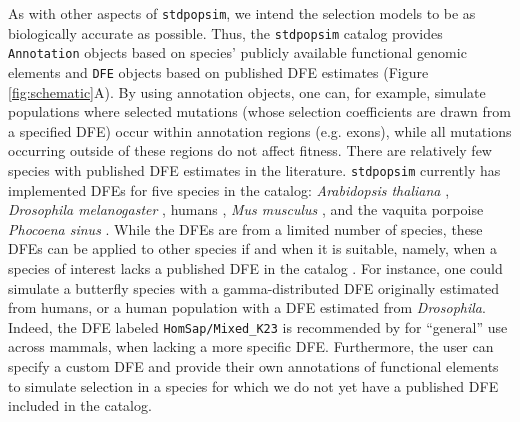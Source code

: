 \documentclass[hidelinks]{article}
\newcommand{\stdpopsim}{\texttt{stdpopsim}\xspace}
\begin{document}
    As with other aspects of \stdpopsim, we intend the selection models to be as biologically accurate as possible.
    Thus, the \stdpopsim catalog provides \texttt{Annotation} objects based on species' publicly available functional genomic elements
    and \texttt{DFE} objects based on published DFE estimates (Figure \ref{fig:schematic}A).
    By using annotation objects, one can, for example, simulate populations where selected mutations (whose selection
    coefficients are drawn from a specified DFE) occur within annotation regions (e.g. exons), while all mutations
    occurring outside of these regions do not affect fitness.
    There are relatively few species with published DFE estimates in the literature.
    \stdpopsim currently has implemented DFEs for five species in the catalog:
    \textit{Arabidopsis thaliana} \citep{huber2018gene},
    \textit{Drosophila melanogaster} \citep{ragsdale2016triallelic,huber2017determining,zhen2021greater},
    humans \citep{huber2017determining,kim2017inference,kyriazis2023using,castellano2019compmarison,castellano2019compmarison,rodrigues2024shared},
    \textit{Mus musculus} \citep{booker2021selective},
    and the vaquita porpoise \textit{Phocoena sinus} \citep{robinson2022critically}.
    While the DFEs are from a limited number of species, these DFEs can be applied to other species
    if and when it is suitable,
    namely, when a species of interest lacks a published DFE in the catalog .
    For instance, one could simulate a butterfly species with a gamma-distributed DFE originally
    estimated from humans, or a human population with a DFE estimated from \textit{Drosophila}.
    Indeed, the DFE labeled \texttt{HomSap/Mixed\_K23} is recommended by \citet{kyriazis2023using}
    for ``general'' use across mammals, when lacking a more specific DFE.
    Furthermore, the user can specify a custom DFE and provide their own annotations
    of functional elements to simulate selection in a species for which we do not yet have
    a published DFE included in the catalog.
\end{document}
